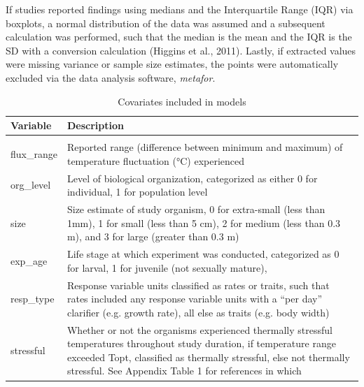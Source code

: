 \documentclass[12pt,twoside]{reedthesis}
\begin{document}
If studies reported findings using medians and the Interquartile Range (IQR) via boxplots, a normal distribution of the data was assumed and a subsequent calculation was performed, such that the median is the mean and the IQR is the SD with a conversion calculation (Higgins et al., 2011). Lastly, if extracted values were missing variance or sample size estimates, the points were automatically excluded via the data analysis software, \emph{metafor}.

\clearpage
\begin{table}[!h]

\caption{\label{tab:unnamed-chunk-9}Covariates included in models}
\centering
\begin{tabular}[t]{l>{\raggedright\arraybackslash}p{8cm}}
\toprule
\textbf{Variable} & \textbf{Description}\\
\midrule
\cellcolor{gray!6}{mean\_temp\_constant} & \cellcolor{gray!6}{Reported mean temperature (°C) in study}\\
flux\_range & Reported range (difference between minimum 
                                     and maximum) of temperature fluctuation (°C) experienced\\
org\_level & Level of biological organization, categorized
                                     as either 0 for individual, 1 for population level
\cellcolor{gray!6}{                                     responses}\\
size & Size estimate of study organism, 0 for extra-small (less than 1mm),
                                     1 for small (less than 5 cm), 2 for medium (less than 0.3 m), and 3
                                     for large (greater than 0.3 m)\\
exp\_age & Life stage at which experiment was conducted, 
                                     categorized as 0 for larval, 1 for juvenile (not sexually mature),
\cellcolor{gray!6}{                                     and 2 for adult}\\
\addlinespace
resp\_type & Response variable units classified as rates or traits, 
                                     such that rates included any response variable units with a
                                     “per day” clarifier (e.g. growth rate), all else as traits (e.g. body
                                     width)\\
stressful & Whether or not the organisms experienced thermally stressful 
                                     temperatures throughout study duration, if temperature range 
                                     exceeded Topt, classified as thermally stressful, else not
                                     thermally stressful. See Appendix Table 1 for references in which
\cellcolor{gray!6}{                                     organisms’ thermal stress metrics were included}\\
\bottomrule
\end{tabular}
\end{table}
\clearpage
\end{document}
